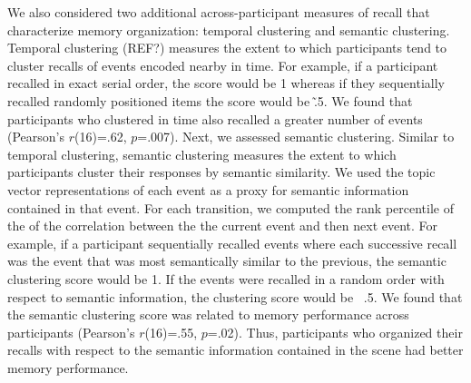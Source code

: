 \documentclass{article}
\begin{document}
{ We also considered two additional across-participant measures of recall that characterize memory organization: temporal clustering and semantic clustering. Temporal clustering (REF?) measures the extent to which participants tend to cluster recalls of events encoded nearby in time.  For example, if a participant recalled in exact serial order, the score would be 1 whereas if they sequentially recalled randomly positioned items the score would be \~.5.  We found that participants who clustered in time also recalled a greater number of events (Pearson's $r$(16)=.62, $p$=.007). Next, we assessed semantic clustering.  Similar to temporal clustering, semantic clustering measures the extent to which participants cluster their responses by semantic similarity.  We used the topic vector representations of each event as a proxy for semantic information contained in that event.  For each transition, we computed the rank percentile of the of the correlation between the the current event and then next event. For example, if a participant sequentially recalled events where each successive recall was the event that was most semantically similar to the previous, the semantic clustering score would be 1.  If the events were recalled in a random order with respect to semantic information, the clustering score would be ~.5. We found that the semantic clustering score was related to memory performance across participants (Pearson's $r$(16)=.55, $p$=.02).  Thus, participants who organized their recalls with respect to the semantic information contained in the scene had better memory performance.

}
\end{document}
